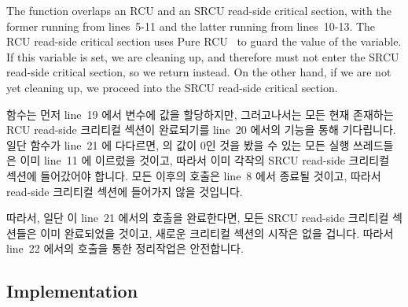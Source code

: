 The  function overlaps an RCU and an SRCU read-side
critical section, with the former running from lines~5-11 and the
latter running from lines~10-13.
The RCU read-side critical section uses Pure
%
%
RCU~\cite{PaulEdwardMcKenneyPhD}
%
to guard the
value of the  variable.
If this variable is set, we are cleaning up, and therefore must not enter
the SRCU read-side critical section, so we return  instead.
On the other hand, if we are not yet cleaning up, we proceed into the
SRCU read-side critical section.
\fi

 함수는 먼저 line~19 에서  변수에 값을 할당하지만,
그러고나서는 모든 현재 존재하는 RCU read-side 크리티컬 섹션이 완료되기를
line~20 에서의  기능을 통해 기다립니다.
일단  함수가 line~21 에 다다르면,  의 값이 0인
것을 봤을 수 있는 모든  실행 쓰레드들은 이미 line~11 에 이르렀을
것이고, 따라서 이미 각작의 SRCU read-side 크리티컬 섹션에 들어갔어야 합니다.
모든 이후의  호출은 line~8 에서 종료될 것이고, 따라서 read-side
크리티컬 섹션에 들어가지 않을 것입니다.

따라서, 일단  이 line~21 에서의  호출을
완료한다면, 모든 SRCU read-side 크리티컬 섹션들은 이미 완료되었을 것이고,
새로운 크리티컬 섹션의 시작은 없을 겁니다.
따라서 line~22 에서의  호출을 통한 정리작업은
안전합니다.

\subsection{Implementation}
\label{sec:app:rcuimpl:Implementation}

